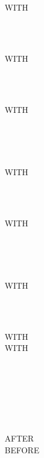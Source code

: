 \begin{syntax}[\miscextcolour]
  WITH
  \begin{1=}
     \\
  \end{1=} \\

  WITH
  \begin{1=}
     \\
  \end{1=} \\

  WITH
  \begin{1=}
     \\
     \\
  \end{1=} \\

  WITH
  \begin{1=}
     \\
  \end{1=} \\

  WITH
  \begin{1=}
     \\
      \\
  \end{1=} \\

  WITH
  \begin{1=}
     \\
  \end{1=} \\

  WITH  \\

  WITH
  \begin{0-1}
  \end{0-1}
  \begin{1=}
     \\
  \end{1=} \\
    
  \begin{1=}
    \begin{1=}
       \\
       \\
    \end{1=}
    AFTER \\
    BEFORE 
  \end{1=}
  \begin{1=}
    \identifier \\
    \integer
  \end{1=}
\end{syntax}


